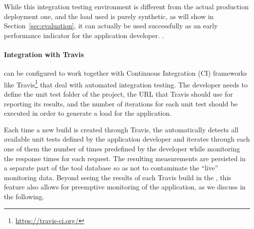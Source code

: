   
  While this integration testing environment is different from the actual production deployment one, and the load used is purely synthetic, as will show in Section~\ref{sec:evaluation}, it can actually be used successfully as an early performance indicator for the application developer. .  


  \paragraph{Integration with Travis}
  

   can be configured to work together with Continuous Integration (CI) frameworks like Travis\footnote{\url{https://travis-ci.org/}} that deal with automated integration testing.
  The developer needs to define the unit test folder of the project, the URL that Travis should use for reporting its results, and the number of iterations for each unit test should be executed in order to generate a load for the application. 
  
  Each time a new build is created through Travis, the \tool automatically detects all available unit tests defined by the application developer and iterates through each one of them the number of times predefined by the developer while monitoring the response times for each request. The resulting measurements are persisted in a separate part of the tool database so as not to contaminate the ``live'' monitoring data. Beyond seeing the results of each Travis build in the \tool, this feature also allows for preemptive monitoring of the application, as we discuss in the following.    

  

